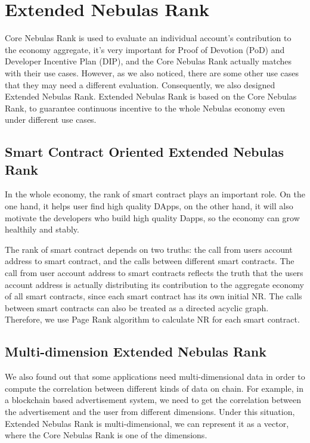 \section{Extended Nebulas Rank}
Core Nebulas Rank is used to evaluate an individual account’s contribution to the economy aggregate, it’s very important for Proof of Devotion (PoD) and Developer Incentive Plan (DIP), and the Core Nebulas Rank actually matches with their use cases. However, as we also noticed, there are some other use cases that they may need a different evaluation. Consequently, we also designed Extended Nebulas Rank. Extended Nebulas Rank is based on the Core Nebulas Rank, to guarantee continuous incentive to the whole Nebulas economy even under different use cases.

\subsection{Smart Contract Oriented Extended Nebulas Rank}
In the whole economy, the rank of smart contract plays an important role. On the one hand, it helps user find high quality DApps, on the other hand, it will also motivate the developers who build high quality Dapps, so the economy can grow healthily and stably.

The rank of smart contract depends on two truths: the call from users account address to smart contract, and the calls between different smart contracts. The call from user account address to smart contracts reflects the truth that the users account address is actually distributing its contribution to the aggregate economy of all smart contracts, since each smart contract has its own initial NR. The calls between smart contracts can also be treated as a directed acyclic graph. Therefore, we use Page Rank algorithm to calculate NR for each smart contract.



\subsection{Multi-dimension Extended Nebulas Rank}
We also found out that some applications need multi-dimensional data in order to compute the correlation between different kinds of data on chain. For example, in a blockchain based advertisement system, we need to get the correlation between the advertisement and the user from different dimensions. Under this situation, Extended Nebulas Rank is multi-dimensional, we can represent it as a vector, where the Core Nebulas Rank is one of the dimensions.

